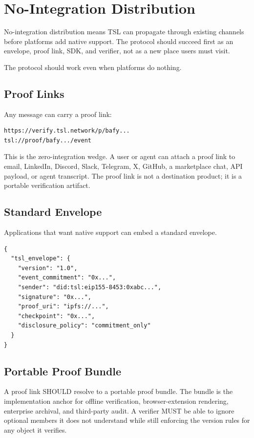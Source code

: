 \documentclass[11pt]{article}
\newcommand{\TSL}{\textsc{TSL}}
\begin{document}
\section{No-Integration Distribution}

No-integration distribution means \TSL{} can propagate through existing channels before platforms add native support. The protocol should succeed first as an envelope, proof link, SDK, and verifier, not as a new place users must visit.


The protocol should work even when platforms do nothing.

\subsection{Proof Links}

Any message can carry a proof link:

\begin{lstlisting}[style=tslcode]
https://verify.tsl.network/p/bafy...
tsl://proof/bafy.../event
\end{lstlisting}

This is the zero-integration wedge. A user or agent can attach a proof link to email, LinkedIn, Discord, Slack, Telegram, X, GitHub, a marketplace chat, API payload, or agent transcript. The proof link is not a destination product; it is a portable verification artifact.

\subsection{Standard Envelope}

Applications that want native support can embed a standard envelope.

\begin{lstlisting}[style=tslcode]
{
  "tsl_envelope": {
    "version": "1.0",
    "event_commitment": "0x...",
    "sender": "did:tsl:eip155-8453:0xabc...",
    "signature": "0x...",
    "proof_uri": "ipfs://...",
    "checkpoint": "0x...",
    "disclosure_policy": "commitment_only"
  }
}
\end{lstlisting}


\subsection{Portable Proof Bundle}

A proof link SHOULD resolve to a portable proof bundle. The bundle is the implementation anchor for offline verification, browser-extension rendering, enterprise archival, and third-party audit. A verifier MUST be able to ignore optional members it does not understand while still enforcing the version rules for any object it verifies.
\end{document}
